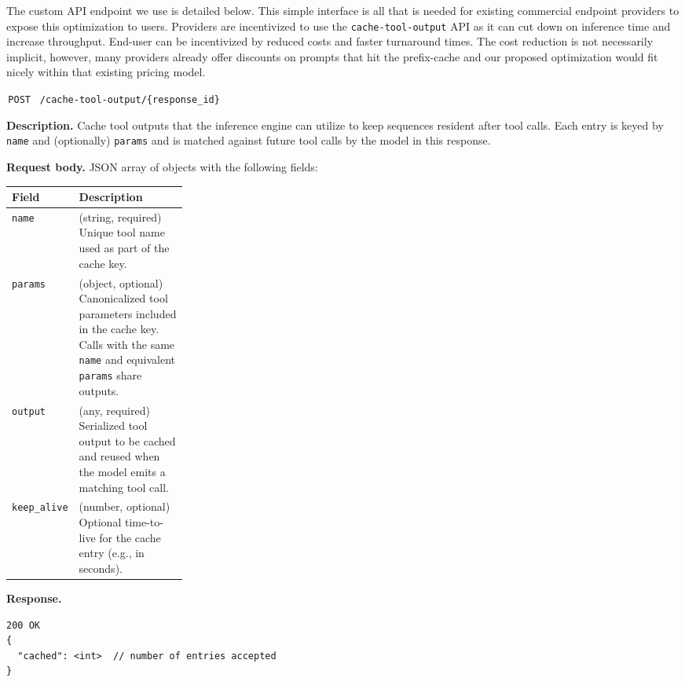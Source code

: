 The custom API endpoint we use is detailed below. This simple interface is all that is needed for existing commercial endpoint providers to expose this optimization to users.
Providers are incentivized to use the \texttt{cache-tool-output} API as it can cut down on inference time and increase throughput.
End-user can be incentivized by reduced costs and faster turnaround times. The cost reduction is not necessarily implicit, however,
many providers already offer discounts on prompts that hit the prefix-cache and our proposed optimization would fit nicely within that existing pricing model.

\begin{apispecbox}{\,\texttt{POST} \small \texttt{ /cache-tool-output/\{response\_id\}}}

\textbf{Description.}  
Cache tool outputs that the inference engine can utilize to keep sequences resident after tool calls. 
Each entry is keyed by \texttt{name} and (optionally) \texttt{params} and is matched against future tool calls by the model in this response.

\medskip
\noindent\textbf{Request body.}  
JSON array of objects with the following fields:
\medskip

\small
\begin{tabularx}{\linewidth}{@{}p{0.26\linewidth} L@{}}
\toprule
\textbf{Field} & \textbf{Description} \\
\midrule
\texttt{name} &
(string, required) Unique tool name used as part of the cache key. \\[0.25em]

\texttt{params} &
(object, optional) Canonicalized tool parameters included in the cache key.
Calls with the same \texttt{name} and equivalent \texttt{params} share outputs. \\[0.25em]

\texttt{output} &
(any, required) Serialized tool output to be cached and reused when the model
emits a matching tool call. \\[0.25em]

\texttt{keep\_alive} &
(number, optional) Optional time-to-live for the cache entry (e.g., in seconds). \\
\bottomrule
\end{tabularx}
\normalsize

\medskip
\noindent\textbf{Response.}
{\small
\begin{verbatim}
200 OK
{
  "cached": <int>  // number of entries accepted
}
\end{verbatim}
}

\end{apispecbox}




